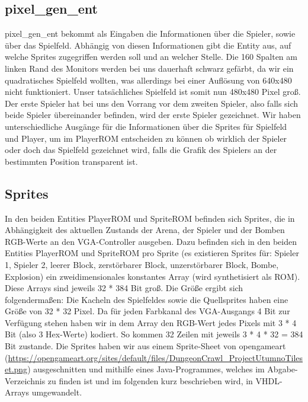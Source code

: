 \documentclass[parskip=full]{scrartcl}
\begin{document}
			\subsection{pixel\_gen\_ent}
				pixel\_gen\_ent bekommt als Eingaben die Informationen über die Spieler, sowie über das Spielfeld. Abhängig von diesen Informationen gibt die Entity aus, auf welche Sprites zugegriffen werden soll und an welcher Stelle.\newline
				Die 160 Spalten am linken Rand des Monitors werden bei uns dauerhaft schwarz gefärbt, da wir ein quadratisches Spielfeld wollten, was allerdings bei einer Auflösung von 640x480 nicht funktioniert. Unser tatsächliches Spielfeld ist somit nun 480x480 Pixel groß.\newline
				Der erste Spieler hat bei uns den Vorrang vor dem zweiten Spieler, also falls sich beide Spieler übereinander befinden, wird der erste Spieler gezeichnet.\newline
				Wir haben unterschiedliche Ausgänge für die Informationen über die Sprites für Spielfeld und Player, um im PlayerROM entscheiden zu können ob wirklich der Spieler oder doch das Spielfeld gezeichnet wird, falls die Grafik des Spielers an der bestimmten Position transparent ist.
		
			\subsection{Sprites}
				In den beiden Entities PlayerROM und SpriteROM befinden sich Sprites, die in Abhängigkeit des aktuellen Zustands der Arena, der Spieler und der Bomben RGB-Werte an den VGA-Controller ausgeben. Dazu befinden sich in den beiden Entities PlayerROM und SpriteROM pro Sprite (es existieren Sprites für: Spieler 1, Spieler 2, leerer Block, zerstörbarer Block, unzerstörbarer Block, Bombe, Explosion) ein zweidimensionales konstantes Array (wird synthetisiert als ROM). Diese Arrays sind jeweils 32 * 384 Bit groß. \newline
				Die Größe ergibt sich folgendermaßen: Die Kacheln des Spielfeldes sowie die Quellsprites haben eine Größe von 32 * 32 Pixel. Da für jeden Farbkanal des VGA-Ausgangs 4 Bit zur Verfügung stehen haben wir in dem Array den RGB-Wert jedes Pixels mit 3 * 4 Bit (also 3 Hex-Werte) kodiert. So kommen 32 Zeilen mit jeweils 
				3 * 4 * 32 = 384 Bit zustande. \newline
				Die Sprites haben wir aus einem Sprite-Sheet von opengameart (\url{https://opengameart.org/sites/default/files/DungeonCrawl_ProjectUtumnoTileset.png}) ausgeschnitten und mithilfe eines Java-Programmes, welches im Abgabe-Verzeichnis zu finden ist und im folgenden kurz beschrieben wird, in VHDL-Arrays umgewandelt.
\end{document}
